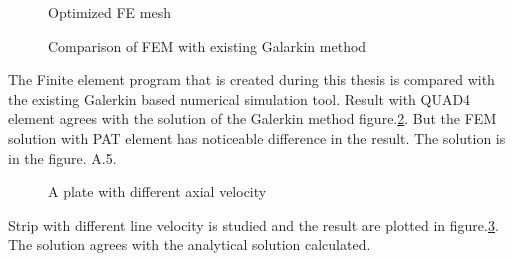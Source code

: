 \documentclass[main.tex]{subfiles}
\begin{document}
\begin{figure}[h!]
\centering

\caption{Optimized FE mesh}
\label{fig:strip_mesh_zoom}
\end{figure}

\begin{figure}[h!]
\centering

\caption{Comparison of FEM with existing Galarkin method}
\label{fig:FEMvsGAL_Plot}
\end{figure}




The Finite element program that is created during this thesis is compared with the existing Galerkin based numerical simulation tool. Result with QUAD4 element agrees with the solution of the Galerkin method figure.\ref{fig:FEMvsGAL_Plot}. But the FEM solution with PAT element has noticeable difference in the result. The solution is in the figure. A.5.


\begin{figure}[h!]
\centering

\caption{A plate with different axial velocity}
\label{fig:Strip_Para_V}
\end{figure}

Strip with different line velocity is studied and the result are plotted in figure.\ref{fig:Strip_Para_V}. The solution agrees with the analytical solution calculated.
\end{document}
